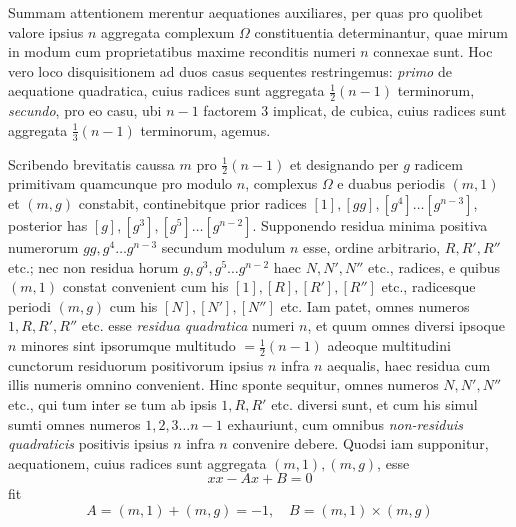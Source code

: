 Summam attentionem merentur aequationes auxiliares, per quas pro quolibet valore ipsius \(n\) aggregata complexum \(\Omega\) constituentia determinantur, quae mirum in modum cum proprietatibus maxime reconditis numeri \(n\) connexae sunt. Hoc vero loco disquisitionem ad duos casus sequentes restringemus: \textit{primo} de aequatione quadratica, cuius radices sunt aggregata \(\frac12(n-1)\) terminorum, \textit{secundo}, pro eo casu, ubi \(n-1\) factorem \(3\) implicat, de cubica, cuius radices sunt aggregata \(\frac13(n-1)\) terminorum, agemus.

Scribendo brevitatis caussa \(m\) pro \(\frac12(n-1)\) et designando per \(g\) radicem primitivam quamcunque pro modulo \(n\), complexus \(\Omega\) e duabus periodis \((m,1)\) et \((m,g)\) constabit, continebitque prior radices \([1],\allowbreak [gg],\allowbreak [g^4]\ldots[g^{n-3}]\), posterior has \([g],\allowbreak [g^3],\allowbreak [g^5]\ldots[g^{n-2}]\). Supponendo residua minima positiva numerorum \(gg,\allowbreak g^4\ldots g^{n-3}\) secundum modulum \(n\) esse, ordine arbitrario, \(R,\allowbreak R',\allowbreak R''\) etc.; nec non residua horum \(g,\allowbreak g^3,\allowbreak g^5\ldots g^{n-2}\) haec \(N,\allowbreak N',\allowbreak N''\) etc., radices, e quibus \((m,1)\) constat convenient cum his \([1],\allowbreak [R],\allowbreak [R'],\allowbreak [R'']\) etc., radicesque periodi \((m,g)\) cum his \([N],\allowbreak [N'],\allowbreak [N'']\) etc. Iam patet, omnes numeros \(1,\allowbreak R,\allowbreak R',\allowbreak R''\) etc. esse \textit{residua quadratica} numeri \(n\), et quum omnes diversi ipsoque \(n\) minores sint ipsorumque multitudo \(=\frac12(n-1)\) adeoque multitudini cunctorum residuorum positivorum ipsius \(n\) infra \(n\) aequalis, haec residua cum illis numeris omnino convenient. Hinc sponte sequitur, omnes numeros \(N,\allowbreak N',\allowbreak N''\) etc., qui tum inter se tum ab ipsis \(1,\allowbreak R,\allowbreak R'\) etc. diversi sunt, et cum his simul sumti omnes numeros \(1,\allowbreak 2,\allowbreak 3\ldots n-1\) exhauriunt, cum omnibus \textit{non-residuis quadraticis} positivis ipsius \(n\) infra \(n\) convenire debere. Quodsi iam supponitur, aequationem, cuius radices sunt aggregata \((m,1),\allowbreak (m,g)\), esse \[xx-Ax+B=0\] fit \[A=(m,1)+(m,g)=-1,\quad B=(m,1)\times(m,g)\]


